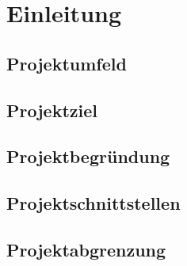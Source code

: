 
\section{Einleitung}
\blindtext
\subsection{Projektumfeld}
\subsection{Projektziel}
\subsection{Projektbegründung}
\subsection{Projektschnittstellen}
\subsection{Projektabgrenzung}